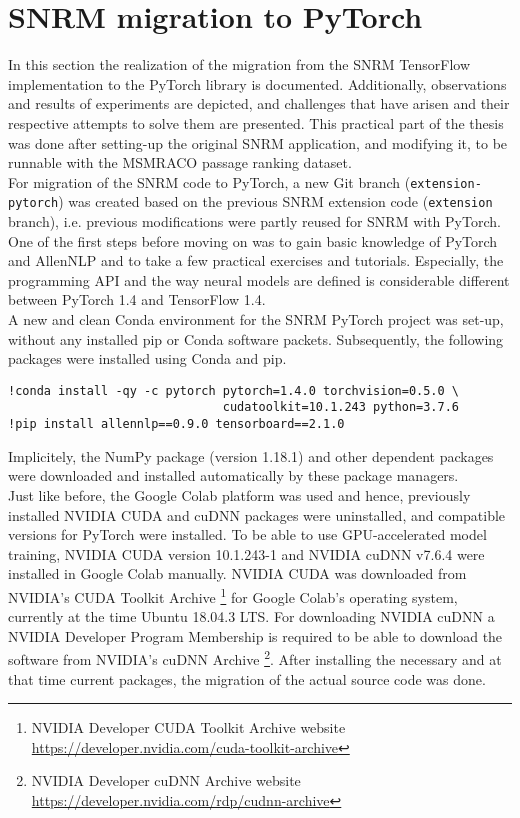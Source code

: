 \section{SNRM migration to PyTorch}

In this section the realization of the migration from the SNRM TensorFlow implementation to the PyTorch library
    is documented.
Additionally, observations and results of experiments are depicted, and
    challenges that have arisen and their respective attempts to solve them are presented.
This practical part of the thesis was done after setting-up the original SNRM application,
    and modifying it, to be runnable with the MSMRACO passage ranking dataset.\\

For migration of the SNRM code to PyTorch, a new Git branch (\texttt{extension-pytorch})
    was created based on the previous SNRM extension code (\texttt{extension} branch), 
    i.e. previous modifications were partly reused for SNRM with PyTorch.
One of the first steps before moving on was to gain basic knowledge of PyTorch and AllenNLP
    and to take a few practical exercises and tutorials.
Especially, the programming API and the way neural models are defined is considerable
    different between PyTorch 1.4 and TensorFlow 1.4.\\

A new and clean Conda environment for the SNRM PyTorch project was set-up,
    without any installed pip or Conda software packets. 
Subsequently, the following packages were installed using Conda and pip.
\begin{verbatim}
!conda install -qy -c pytorch pytorch=1.4.0 torchvision=0.5.0 \
                              cudatoolkit=10.1.243 python=3.7.6
!pip install allennlp==0.9.0 tensorboard==2.1.0
\end{verbatim}
Implicitely, the NumPy package (version 1.18.1) and other dependent packages were downloaded
    and installed automatically by these package managers. \\
Just like before, the Google Colab platform was used and hence, previously 
    installed NVIDIA CUDA and cuDNN packages were uninstalled,
    and compatible versions for PyTorch were installed.
To be able to use GPU-accelerated model training, NVIDIA CUDA version 10.1.243-1 
    and NVIDIA cuDNN v7.6.4 were installed in Google Colab manually.
NVIDIA CUDA was downloaded from NVIDIA's CUDA Toolkit Archive
    \footnote{NVIDIA Developer CUDA Toolkit Archive website \url{https://developer.nvidia.com/cuda-toolkit-archive}}
    for Google Colab's operating system, currently at the time Ubuntu 18.04.3 LTS.
For downloading NVIDIA cuDNN a NVIDIA Developer Program Membership is required to be able to
    download the software from NVIDIA's cuDNN Archive
    \footnote{NVIDIA Developer cuDNN Archive website \url{https://developer.nvidia.com/rdp/cudnn-archive}}.
After installing the necessary and at that time current packages, the migration of the actual source code
    was done.

